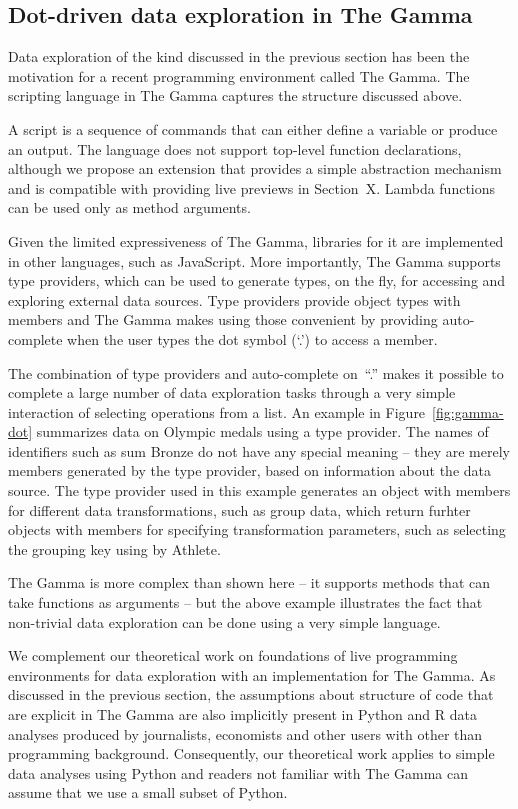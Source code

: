 \documentclass[acmsmall,anonymous,fleqn]{acmart}\settopmatter{printfolios=false,printccs=false,printacmref=false}
\theoremstyle{plain}
\theoremstyle{definition}
\newcommand{\qident}[1]{\textnormal{\sffamily \textquotesingle #1\textquotesingle}}
\begin{document}
\subsection{Dot-driven data exploration in The Gamma}
\label{sec:background-gamma}

Data exploration of the kind discussed in the previous section has been the motivation
for a recent programming environment called The Gamma. The scripting language in The Gamma
captures the structure discussed above.

A script is a sequence of commands that can either define a
variable or produce an output. The language does not support top-level function declarations,
although we propose an extension that provides a simple abstraction mechanism and is compatible with
providing live previews in Section~X. Lambda functions can be used only as method
arguments.

Given the limited expressiveness of The Gamma, libraries for it are implemented in other languages, such as
JavaScript. More importantly, The Gamma supports type providers, which can be used to generate types,
on the fly, for accessing and exploring external data sources. Type providers provide object types
with members and The Gamma makes using those convenient by providing auto-complete when the user
types the dot symbol (`.') to access a member.

The combination of type providers and auto-complete on~``.'' makes it possible to complete a
large number of data exploration tasks through a very simple interaction of selecting operations from
a list. An example in Figure~\ref{fig:gamma-dot} summarizes data on Olympic medals using a type provider.
The names of identifiers such as \qident{sum Bronze} do not have
any special meaning -- they are merely members generated by the type provider, based on information
about the data source. The type provider used in this example generates an object with members for
different data transformations, such as \qident{group data}, which return furhter objects with
members for specifying transformation parameters, such as selecting the grouping key using
\qident{by Athlete}.

The Gamma is more complex than shown here -- it supports methods that can take
functions as arguments -- but the above example illustrates the fact that non-trivial data
exploration can be done using a very simple language.

We complement our theoretical work on foundations of live programming environments for data
exploration with an implementation for The Gamma. As discussed in the previous
section, the assumptions about structure of code that are explicit in The Gamma are also
implicitly present in Python and R data analyses produced by journalists, economists and
other users with other than  programming background. Consequently, our theoretical work
applies to simple data analyses using Python and readers not familiar with The Gamma
can assume that we use a small subset of Python.
\end{document}
